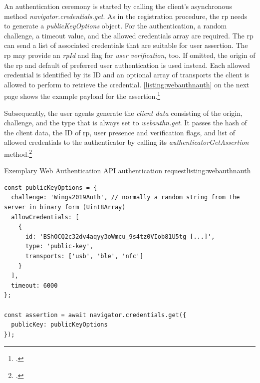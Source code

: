 An authentication ceremony is started by calling the client's asynchronous method \textit{navigator.credentials.get}. As in the registration procedure, the \gls{rp} needs to generate a \textit{publicKeyOptions} object. For the authentication, a random challenge, a timeout value, and the allowed credentials array are required. The \gls{rp} can send a list of associated credentials that are suitable for user assertion. The \gls{rp} may provide an \textit{rpId} and flag for \textit{user verification}, too. If omitted, the origin of the \gls{rp} and default of preferred user authentication is used instead. Each allowed credential is identified by its ID and an optional array of transports the client is allowed to perform to retrieve the credential. \autoref{listing:webauthnauth} on the next page shows the example payload for the assertion.\footcites[See][Chapter 5.1.4., 5.5, 5.10.3.]{w3c}

Subsequently, the user agents generate the \textit{client data} consisting of the origin, challenge, and the type that is always set to \textit{webauthn.get}. It passes the hash of the client data, the ID of \gls{rp}, user presence and verification flags, and list of allowed credentials to the authenticator by calling its \textit{authenticatorGetAssertion} method.\footcites[See][Chapter 6.3.3]{w3c}
\\
\begin{example}{Exemplary Web Authentication API authentication request}{listing:webauthnauth}
\begin{verbatim}
const publicKeyOptions = {
  challenge: 'Wings2019Auth', // normally a random string from the server in binary form (Uint8Array)
  allowCredentials: [
    {
      id: 'BShOCQ2c32dv4aqyy3oWmcu_9s4tz0VIob81U5tg [...]',
      type: 'public-key',
      transports: ['usb', 'ble', 'nfc']
    }
  ],
  timeout: 6000
};

const assertion = await navigator.credentials.get({
  publicKey: publicKeyOptions
});
\end{verbatim}
\end{example}

